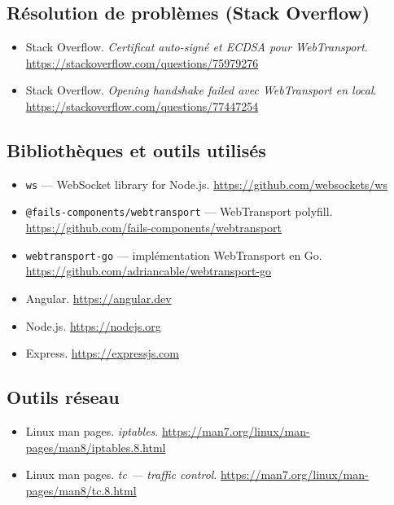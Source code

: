 \subsection*{Résolution de problèmes (Stack Overflow)}

\begin{itemize}
    \item Stack Overflow. \textit{Certificat auto-signé et ECDSA pour WebTransport}. \url{https://stackoverflow.com/questions/75979276}
    \item Stack Overflow. \textit{Opening handshake failed avec WebTransport en local}. \url{https://stackoverflow.com/questions/77447254}
\end{itemize}

\subsection*{Bibliothèques et outils utilisés}

\begin{itemize}
    \item \texttt{ws} --- WebSocket library for Node.js. \url{https://github.com/websockets/ws}
    \item \texttt{@fails-components/webtransport} --- WebTransport polyfill. \url{https://github.com/fails-components/webtransport}
    \item \texttt{webtransport-go} --- implémentation WebTransport en Go. \url{https://github.com/adriancable/webtransport-go}
    \item Angular. \url{https://angular.dev}
    \item Node.js. \url{https://nodejs.org}
    \item Express. \url{https://expressjs.com}
\end{itemize}

\subsection*{Outils réseau}

\begin{itemize}
    \item Linux man pages. \textit{iptables}. \url{https://man7.org/linux/man-pages/man8/iptables.8.html}
    \item Linux man pages. \textit{tc --- traffic control}. \url{https://man7.org/linux/man-pages/man8/tc.8.html}
\end{itemize}
